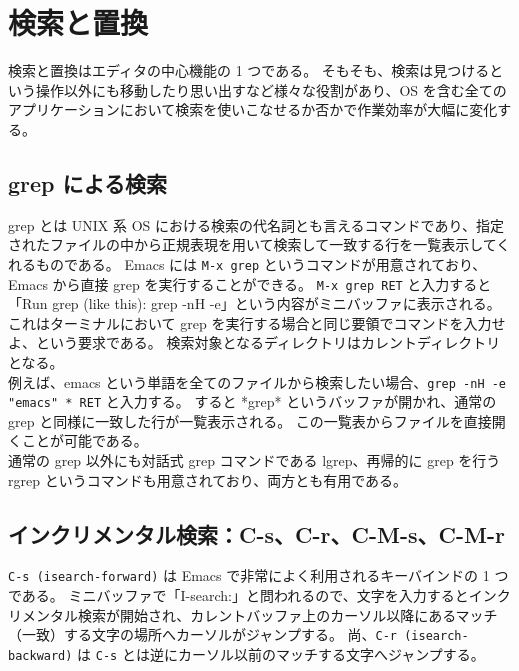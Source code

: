 \section{検索と置換}
検索と置換はエディタの中心機能の 1 つである。
そもそも、検索は見つけるという操作以外にも移動したり思い出すなど様々な役割があり、OS を含む全てのアプリケーションにおいて検索を使いこなせるか否かで作業効率が大幅に変化する。
\subsection{grep による検索}
grep とは UNIX 系 OS における検索の代名詞とも言えるコマンドであり、指定されたファイルの中から正規表現を用いて検索して一致する行を一覧表示してくれるものである。
Emacs には \texttt{M-x grep} というコマンドが用意されており、Emacs から直接 grep を実行することができる。
\texttt{M-x grep RET} と入力すると「Run grep (like this): grep -nH -e」という内容がミニバッファに表示される。
これはターミナルにおいて grep を実行する場合と同じ要領でコマンドを入力せよ、という要求である。
検索対象となるディレクトリはカレントディレクトリとなる。\\

例えば、emacs という単語を全てのファイルから検索したい場合、\verb'grep -nH -e "emacs" * RET' と入力する。
すると *grep* というバッファが開かれ、通常の grep と同様に一致した行が一覧表示される。\enlargethispage{0.50zw}
この一覧表からファイルを直接開くことが可能である。\\

通常の grep 以外にも対話式 grep コマンドである lgrep、再帰的に grep を行う rgrep というコマンドも用意されており、両方とも有用である。
\subsection{インクリメンタル検索：C-s、C-r、C-M-s、C-M-r}
\texttt{C-s (isearch-forward)} は Emacs で非常によく利用されるキーバインドの 1 つである。
ミニバッファで「I-search:」と問われるので、文字を入力するとインクリメンタル検索が開始され、カレントバッファ上のカーソル以降にあるマッチ（一致）する文字の場所へカーソルがジャンプする。
尚、\texttt{C-r (isearch-backward)} は \texttt{C-s} とは逆にカーソル以前のマッチする文字へジャンプする。\\

